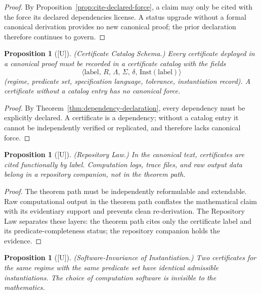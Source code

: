 \documentclass[12pt,oneside]{amsbook}
\theoremstyle{plain}
\newtheorem{proposition}[theorem]{Proposition}
\theoremstyle{definition}
\theoremstyle{remark}
\newcommand{\status}[1]{\textup{[#1]}}
\begin{document}
\begin{proof}
By Proposition~\ref{prop:cite-declared-force}, a claim may only be
cited with the force its declared dependencies license.  A status
upgrade without a formal canonical derivation provides no new canonical
proof; the prior declaration therefore continues to govern.
\end{proof}


\begin{proposition}[\status{U}]\label{prop:cert-catalog}
\textup{(Certificate Catalog Schema.)}  Every certificate deployed in
a canonical proof must be recorded in a certificate catalog with the
fields
\[
  \langle\mathrm{label},\, R,\, \Lambda,\, \Sigma,\,
  \delta,\, \mathrm{Inst}(\mathrm{label})\rangle
\]
(regime, predicate set, specification language, tolerance,
instantiation record).  A certificate without a catalog entry has
no canonical force.
\end{proposition}

\begin{proof}
By Theorem~\ref{thm:dependency-declaration}, every dependency must be
explicitly declared.  A certificate is a dependency; without a catalog
entry it cannot be independently verified or replicated, and therefore
lacks canonical force.
\end{proof}

\begin{proposition}[\status{U}]\label{prop:repository-law}
\textup{(Repository Law.)}  In the canonical text, certificates are
cited functionally by label.  Computation logs, trace files, and raw
output data belong in a repository companion, not in the theorem path.
\end{proposition}

\begin{proof}
The theorem path must be independently reformulable and extendable.
Raw computational output in the theorem path conflates the mathematical
claim with its evidentiary support and prevents clean re-derivation.
The Repository Law separates these layers: the theorem path cites only
the certificate label and its predicate-completeness status; the
repository companion holds the evidence.
\end{proof}

\begin{proposition}[\status{U}]\label{prop:software-invariance}
\textup{(Software-Invariance of Instantiation.)}  Two certificates for
the same regime with the same predicate set have identical admissible
instantiations.  The choice of computation software is invisible to
the mathematics.
\end{proposition}
\end{document}
